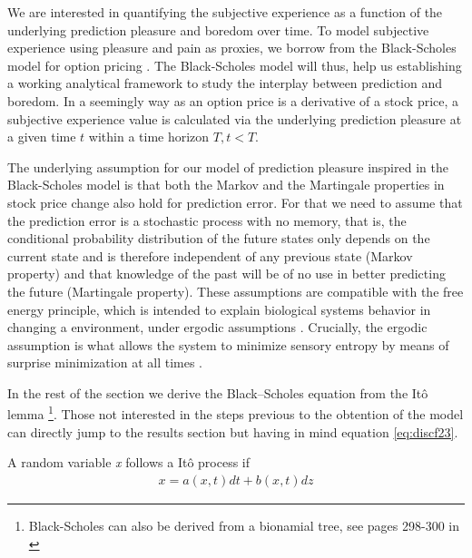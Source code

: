\documentclass[11pt, onecolumn]{article}
\begin{document}
We are interested in quantifying the subjective experience as a function of the underlying prediction pleasure and boredom over time. To model subjective experience using pleasure and pain as proxies, we borrow from the Black-Scholes model for option pricing  \citep{black_pricing_1973}. The Black-Scholes model will thus, help us establishing a working analytical framework to study the interplay between prediction and boredom. In a seemingly way as an option price is a derivative of a stock price, a subjective experience value is calculated via the underlying prediction pleasure at a given time $t$ within a time horizon $T, t < T$. 
 
The underlying assumption for our model of prediction pleasure inspired in the Black-Scholes model is that both the Markov and the Martingale properties in stock price change also hold for prediction error. For that we need to assume that the prediction error is a stochastic process with no memory, that is, the conditional probability distribution of the future states only depends on the current state and is therefore independent of any previous state (Markov property) and that knowledge of the past will be of no use in better predicting the future (Martingale property). These assumptions are compatible with the free energy principle, which is intended to explain biological systems behavior in changing a environment, under ergodic assumptions \citep{birkhoff_proof_1931}. Crucially, the ergodic assumption is what allows the system to minimize sensory entropy by means of surprise minimization at all times \citep{friston_action_2010}. 

In the rest of the section we derive the Black–Scholes equation from the It\^{o} lemma \citep{ito_stochastic_1951} \footnote{Black-Scholes can  also be derived from a bionamial tree, see pages 298-300 in \citep{hull_options_2011}}. Those not interested in the steps previous to the obtention of the model can directly jump to  the results section but having in mind equation \ref{eq:discf23}.

A random variable \emph{x} follows a It\^{o} process if 
\begin{equation*}
\begin{split}
   x = a(x,t)dt + b(x,t)dz
\end{split}
\label{eq:itopr}
\end{equation*}
\end{document}
